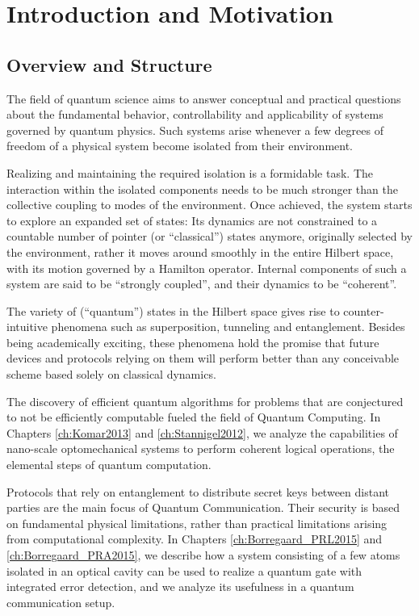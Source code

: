 \chapter{Introduction and Motivation}

\section{Overview and Structure}
The field of quantum science aims to answer conceptual and practical questions
about the fundamental behavior, controllability and applicability of 
systems governed by quantum physics. Such systems arise whenever a few 
degrees of freedom of a physical system become isolated from their environment. 

Realizing and maintaining the required isolation is a formidable
task. The interaction within the isolated components needs to be
much stronger than the collective coupling to modes of the environment.
Once achieved, the system starts to explore an expanded set of states: Its
dynamics are not constrained to a countable number of pointer (or
``classical'') states anymore, originally selected by the environment, rather it
moves around smoothly in the entire Hilbert space, with its motion governed by a
Hamilton operator. Internal components of such a system are said to be ``strongly
coupled'', and their dynamics to be ``coherent''.

The variety of (``quantum'') states in the Hilbert space  gives rise
to counter-intuitive phenomena such as superposition, tunneling and
entanglement.
Besides being academically exciting, these phenomena hold the promise that
future devices and protocols relying on them will perform better than any
conceivable scheme based solely on classical dynamics. 

The discovery of
efficient quantum algorithms for problems that are conjectured to not be
efficiently computable fueled the field of Quantum Computing. In Chapters
\ref{ch:Komar2013} and \ref{ch:Stannigel2012}, we analyze the
capabilities of nano-scale optomechanical systems to perform coherent logical
operations, the elemental steps of quantum computation.

Protocols that rely on entanglement to distribute secret keys between distant
parties are the main focus of Quantum Communication. Their security is based on
fundamental physical limitations, rather than practical limitations arising from
computational complexity.
In Chapters \ref{ch:Borregaard_PRL2015} and \ref{ch:Borregaard_PRA2015}, we
describe how a system consisting of a few atoms isolated in an optical cavity
can be used to realize a quantum gate with integrated error detection, and we
analyze its usefulness in a quantum communication setup.

